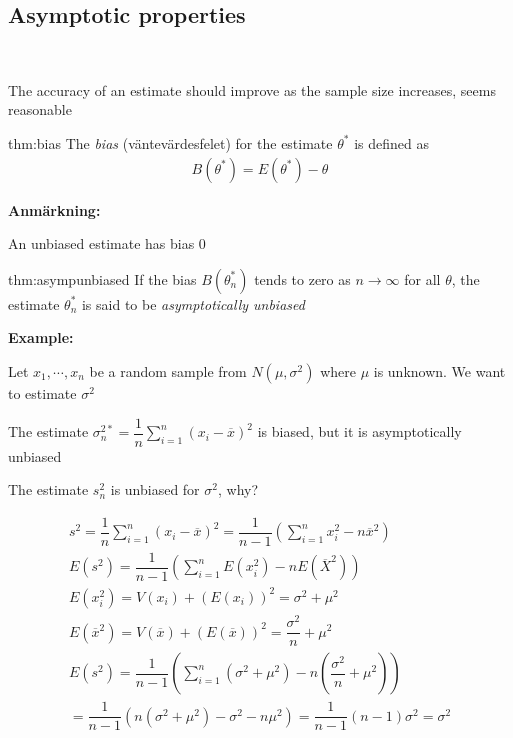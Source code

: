 \subsection{Asymptotic properties}\hfill\\\par
\noindent The accuracy of an estimate should improve as the sample size increases, seems reasonable
\par\bigskip
\begin{theo}[Bias]{thm:bias}
  The \textit{bias} (väntevärdesfelet) for the estimate $\theta^*$ is defined as
  \begin{equation*}
    \begin{gathered}
      B(\theta^*) = E(\theta^*)-\theta
    \end{gathered}
  \end{equation*}
\end{theo}
\par\bigskip
\noindent\textbf{Anmärkning:}\par
\noindent An unbiased estimate has bias 0
\par\bigskip
\begin{theo}{thm:asympunbiased}
  If the bias $B(\theta_n^*)$ tends to zero as $n\to\infty$ for all $\theta$, the estimate $\theta_n^*$ is said to be \textit{asymptotically unbiased} 
\end{theo}
\par\bigskip
\noindent\textbf{Example:}\par
\noindent Let $x_1,\cdots,x_n$ be a random sample from $N(\mu,\sigma^2)$ where $\mu$ is unknown. We want to estimate $\sigma^2$
\par\bigskip
\noindent The estimate $\sigma_n^{2*} = \dfrac{1}{n}\sum_{i=1}^{n}(x_i-\overline{x})^2$ is biased, but it is asymptotically unbiased
\par\bigskip
\noindent The estimate $s_n^2$  is unbiased for $\sigma^2$, why?
\par\bigskip
\begin{equation*}
  \begin{gathered}
    s^2 = \dfrac{1}{n}\sum_{i=1}^{n}(x_i-\overline{x})^2 = \dfrac{1}{n-1}\left(\sum_{i=1}^{n}x_i^2-n\overline{x}^2\right)\\
    E(s^2) = \dfrac{1}{n-1}\left(\sum_{i=1}^{n}E(x_i^2)-nE(\overline{X}^2)\right)\\
    E(x_i^2) = V(x_i) + (E(x_i))^2 = \sigma^2+\mu^2\\
    E(\overline{x}^2) = V(\overline{x}) + (E(\overline{x}))^2 = \dfrac{\sigma^2}{n}+\mu^2\\
    E(s^2) = \dfrac{1}{n-1}\left(\sum_{i=1}^{n}(\sigma^2+\mu^2)-n\left(\dfrac{\sigma^2}{n}+\mu^2\right)\right)\\
    = \dfrac{1}{n-1}\left(n(\sigma^2+\mu^2)-\sigma^2-n\mu^2\right) = \dfrac{1}{n-1}(n-1)\sigma^2 = \sigma^2
  \end{gathered}
\end{equation*}
